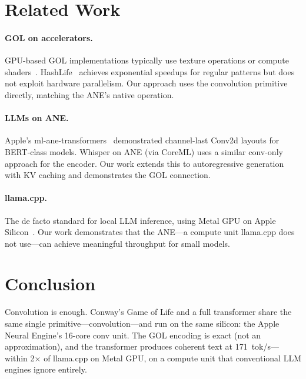 \documentclass[11pt,twocolumn]{article}
\begin{document}
\section{Related Work}
\label{sec:related}

\paragraph{GOL on accelerators.} GPU-based GOL implementations
typically use texture operations or compute shaders~\cite{harris2005}.
HashLife~\cite{gosper1984} achieves exponential speedups for regular
patterns but does not exploit hardware parallelism. Our approach uses
the convolution primitive directly, matching the ANE's native
operation.

\paragraph{LLMs on ANE.} Apple's ml-ane-transformers~\cite{apple2022}
demonstrated channel-last Conv2d layouts for BERT-class models.
Whisper on ANE (via CoreML) uses a similar conv-only approach for the
encoder. Our work extends this to autoregressive generation with KV
caching and demonstrates the GOL connection.

\paragraph{llama.cpp.} The de facto standard for local LLM inference,
using Metal GPU on Apple Silicon~\cite{gerganov2023}. Our work
demonstrates that the ANE---a compute unit llama.cpp does not use---can
achieve meaningful throughput for small models.


\section{Conclusion}

Convolution is enough. Conway's Game of Life and a full transformer
share the same single primitive---convolution---and run on the same
silicon: the Apple Neural Engine's 16-core conv unit. The GOL encoding
is exact (not an approximation), and the transformer produces coherent
text at 171~tok/s---within 2$\times$ of llama.cpp on Metal GPU, on a
compute unit that conventional LLM engines ignore entirely.
\end{document}
